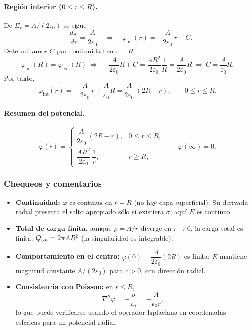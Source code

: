 \documentclass{article}
\begin{document}
\paragraph{Región interior ($0\le r\le R$).}
De $E_r=A/(2\varepsilon_0)$ se sigue
\[
-\,\frac{d\varphi}{dr}=\frac{A}{2\varepsilon_0}\quad\Longrightarrow\quad
\varphi_{\text{int}}(r)=-\frac{A}{2\varepsilon_0}\,r+C.
\]
Determinamos $C$ por continuidad en $r=R$:
\[
\varphi_{\text{int}}(R)=\varphi_{\text{ext}}(R)
\ \Rightarrow\ 
-\frac{A}{2\varepsilon_0}R+C=\frac{A R^2}{2\varepsilon_0}\frac{1}{R}=\frac{A}{2\varepsilon_0}R
\ \Rightarrow\
C=\frac{A}{\varepsilon_0}R.
\]
Por tanto,
\[
\boxed{\ \varphi_{\text{int}}(r)= -\,\frac{A}{2\varepsilon_0}\,r+\frac{A}{\varepsilon_0}R
=\frac{A}{2\varepsilon_0}\,(2R-r),\qquad 0\le r\le R. \ }
\]

\paragraph{Resumen del potencial.}
\[
\boxed{
\varphi(r)=
\begin{cases}
\dfrac{A}{2\varepsilon_0}\,(2R-r), & 0\le r\le R,\\[8pt]
\dfrac{A R^2}{2\varepsilon_0}\,\dfrac{1}{r}, & r\ge R,
\end{cases}
\qquad \varphi(\infty)=0.}
\]

\subsubsection*{Chequeos y comentarios}
\begin{itemize}
\item \textbf{Continuidad:} $\varphi$ es continua en $r=R$ (no hay capa superficial). Su derivada radial presenta el salto apropiado sólo si existiera $\sigma$; aquí $E$ es continuo.
\item \textbf{Total de carga finita:} aunque $\rho=A/r$ diverge en $r\to 0$, la carga total es finita: $Q_{\rm tot}=2\pi A R^2$ (la singularidad es integrable).
\item \textbf{Comportamiento en el centro:} $\varphi(0)=\dfrac{A}{2\varepsilon_0}(2R)$ es finita; $E$ mantiene magnitud constante $A/(2\varepsilon_0)$ para $r>0$, con dirección radial.
\item \textbf{Consistencia con Poisson:} en $r\le R$, 
\[
\nabla^2\varphi=-\frac{\rho}{\varepsilon_0}=-\frac{A}{\varepsilon_0 r},
\]
lo que puede verificarse usando el operador laplaciano en coordenadas esféricas para un potencial radial.
\end{itemize}
\end{document}

